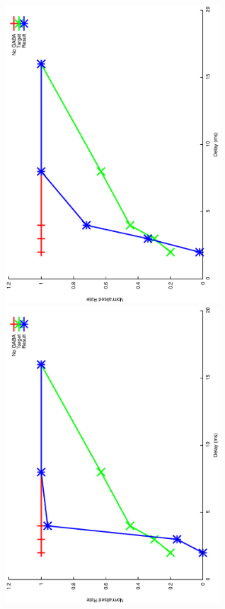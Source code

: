 \documentclass{article}
\begin{document}
\includegraphics[keepaspectratio=true,angle=-90,width=0.6\textwidth]{DS_ClickRecovery_result.29.eps}\clearpage
\includegraphics[keepaspectratio=true,angle=-90,width=0.6\textwidth]{DS_ClickRecovery_result.30.eps}\clearpage
\end{document}
